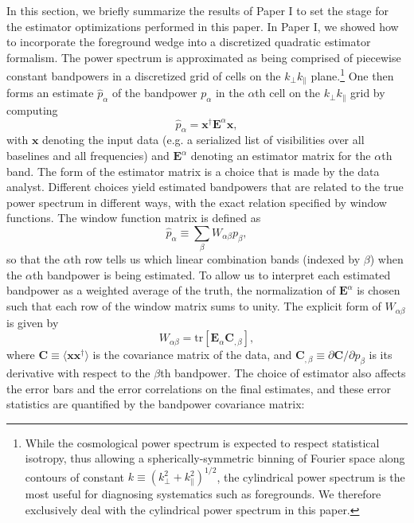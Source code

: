 \documentclass[twocolumn,aps,prd,nofootinbib,showpacs]{revtex4-1}
\begin{document}
In this section, we briefly summarize the results of Paper I to set the stage for the estimator optimizations performed in this paper.  In Paper I, we showed how to incorporate the foreground wedge into a discretized quadratic estimator formalism.  The power spectrum is approximated as being comprised of piecewise constant bandpowers in a discretized grid of cells on the $k_\perp k_\parallel$ plane.\footnote{While the cosmological power spectrum is expected to respect statistical isotropy, thus allowing a spherically-symmetric binning of Fourier space along contours of constant $k\equiv (k_\perp^2 + k_\parallel^2)^{1/2}$, the cylindrical power spectrum is the most useful for diagnosing systematics such as foregrounds.  We therefore exclusively deal with the cylindrical power spectrum in this paper.}  One then forms an estimate $\widehat{p}_\alpha$ of the bandpower $p_\alpha$ in the $\alpha$th cell on the $k_\perp k_\parallel$ grid by computing
\begin{equation}
\label{eq:GenericEst}
\widehat{p}_\alpha = \mathbf{x}^\dagger \mathbf{E}^\alpha \mathbf{x},
\end{equation}
with $\mathbf{x}$ denoting the input data (e.g. a serialized list of visibilities over all baselines and all frequencies) and $\mathbf{E}^\alpha$ denoting an estimator matrix for the $\alpha$th band.  The form of the estimator matrix is a choice that is made by the data analyst.  Different choices yield estimated bandpowers that are related to the true power spectrum in different ways, with the exact relation specified by window functions.  The window function matrix is defined as
\begin{equation}
\label{eq:WindDef}
\widehat{p}_\alpha \equiv \sum_\beta W_{\alpha \beta} p_\beta,
\end{equation}
so that the $\alpha$th row tells us which linear combination bands (indexed by $\beta$) when the $\alpha$th bandpower is being estimated.  To allow us to interpret each estimated bandpower as a weighted average of the truth, the normalization of $\mathbf{E}^\alpha$ is chosen such that each row of the window matrix sums to unity.  The explicit form of $W_{\alpha \beta}$ is given by
\begin{equation}
\label{eq:WindExplicitForm}
W_{\alpha \beta} = \textrm{tr} \left[ \mathbf{E}_\alpha \mathbf{C}_{,\beta} \right],
\end{equation}
where $\mathbf{C} \equiv \langle \mathbf{x} \mathbf{x}^\dagger \rangle$ is the covariance matrix of the data, and $\mathbf{C}_{,\beta} \equiv \partial \mathbf{C} / \partial p_\beta$ is its derivative with respect to the $\beta$th bandpower.  The choice of estimator also affects the error bars and the error correlations on the final estimates, and these error statistics are quantified by the bandpower covariance matrix:
\end{document}
